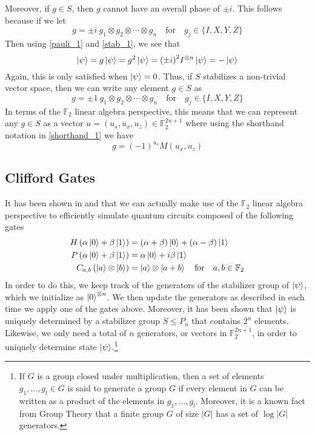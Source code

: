 \message{ !name(report_1.tex)}\documentclass[11pt]{article}
\theoremstyle{definition}
\theoremstyle{plain}
\begin{document}
Moreover, if $g \in S$, then $g$ cannot have an overall phase of $\pm i$. This follows because if we let
\begin{equation}
  g = \pm i \ g_1 \otimes g_2 \otimes \cdots \otimes g_n
  \quad \text{for} \quad g_j \in \{I, X, Y, Z \} 
\end{equation}
Then using {\ref{pauli_1}} and {\ref{stab_1}}, we see that 
\begin{equation}
  \ket{\psi} = g \ket{\psi} = g^2 \ket{\psi} = {(\pm i)}^2 I^{\otimes n} \ket{\psi}
  = -\ket{\psi}
\end{equation}
Again, this is only satisfied when $\ket{\psi} = 0$. Thus, if $S$ stabilizes a non-trivial vector space, then we can write any element $g \in S$ as
\begin{equation}
  g = \pm 1 \ g_1 \otimes g_2 \otimes \cdots \otimes g_n
  \quad \text{for} \quad g_j \in \{I, X, Y, Z \} 
\end{equation}
In terms of the $\mathbb{F}_2$ linear algebra perspective, this means that we can represent any $g \in S$ as a vector $u = (u_s, u_x, u_z) \in \mathbb{F}_2^{2n+1}$ where using the shorthand notation in {\ref{shorthand_1}} we have
\begin{equation}\label{stab_shorthand}
  g = {(-1)}^{u_s} M(u_x, u_z) 
\end{equation}

\subsection{Clifford Gates}\label{clifford_gates}
It has been shown in {\cite{nc}} and {\cite{aaronson}} that we can actually make use of the $\mathbb{F}_2$ linear algebra perspective to efficiently simulate quantum circuits composed of the following gates 
\begin{align}
  H \left( \alpha \ket{0} + \beta \ket{1} \right) &= (\alpha + \beta) \ket{0}
    + (\alpha - \beta) \ket{1} \\
  P \left( \alpha \ket{0} + \beta \ket{1} \right) &= \alpha \ket{0}
    + i \beta \ket{1} \\
  C_{a,b}\left( \ket{a} \otimes \ket{b} \right) &= \ket{a} \otimes \ket{a + b}
    \quad \text{for} \quad a, b \in \mathbb{F}_2 
\end{align}
In order to do this, we keep track of the generators of the stabilizer group of $\ket{\psi}$, which we initialize as $\ket{0}^{\otimes n}$. We then update the generators as described in {\cite{aaronson}} each time we apply one of the gates above. Moreover, it has been shown that $\ket{\psi}$ is uniquely determined by a stabilizer group $S \leq P_n$ that contains $2^n$ elements. Likewise, we only need a total of $n$ generators, or vectors in $\mathbb{F}_2^{2n+1}$, in order to uniquely determine state $\ket{\psi}$.\footnote{If $G$ is a group closed under multiplication, then a set of elements $g_1, \ldots, g_l \in G$ is said to generate a group $G$ if every element in $G$ can be written as a product of the elements in $g_1, \ldots, g_l$. Moreover, it is a known fact from Group Theory that a finite group $G$ of size $|G|$ has a set of $\log |G|$ generators. }
\end{document}
